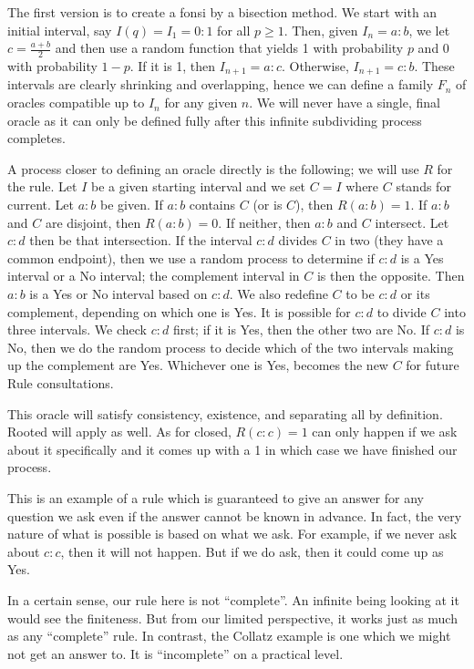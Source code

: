 \documentclass[12pt]{article}
\theoremstyle{remark}
\begin{document}
The first version is to create a fonsi by a bisection method. We start with an initial interval, say $I(q) = I_1 = 0:1$ for all $p\geq 1$. Then, given $I_n = a:b$, we let $c = \tfrac{a+b}{2}$ and then use a random function that yields 1 with probability $p$ and 0 with probability $1-p$. If it is 1, then $I_{n+1} = a:c$. Otherwise, $I_{n+1} = c:b$. These intervals are clearly shrinking and overlapping, hence we can define a family $F_n$ of oracles compatible up to $I_n$ for any given $n$. We will never have a single, final oracle as it can only be defined fully after this infinite subdividing process completes. 

A process closer to defining an oracle directly is the following; we will use $R$ for the rule. Let $I$ be a given starting interval and we set $C=I$ where $C$ stands for current. Let $a:b$ be given. If $a:b$ contains $C$ (or is $C$), then $R(a:b) = 1$. If $a:b$ and $C$ are disjoint, then $R(a:b) = 0$. If neither, then $a:b$ and $C$ intersect. Let $c:d$ then be that intersection. If the interval $c:d$ divides $C$ in two (they have a common endpoint), then we use a random process to determine if $c:d$ is a Yes interval or a No interval; the complement interval in $C$ is then the opposite. Then $a:b$ is a Yes or No interval based on $c:d$. We also redefine $C$ to be $c:d$ or its complement, depending on which one is Yes. It is possible for $c:d$ to divide $C$ into three intervals. We check $c:d$ first; if it is Yes, then the other two are No. If $c:d$ is No, then we do the random process to decide which of the two intervals making up the complement are Yes. Whichever one is Yes, becomes the new $C$ for future Rule consultations.  

This oracle will satisfy consistency, existence, and separating all by definition. Rooted will apply as well. As for closed, $R(c:c)=1$ can only happen if we ask about it specifically and it comes up with a 1 in which case we have finished our process. 

This is an example of a rule which is guaranteed to give an answer for any question we ask even if the answer cannot be known in advance. In fact, the very nature of what is possible is based on what we ask. For example, if we never ask about  $c:c$, then it will not happen. But if we do ask, then it could come up as Yes. 

In a certain sense, our rule here is not ``complete''. An infinite being looking at it would see the finiteness. But from our limited perspective, it works just as much as any ``complete'' rule. In contrast, the Collatz example is one which we might not get an answer to. It is ``incomplete'' on a practical level. 
\end{document}
